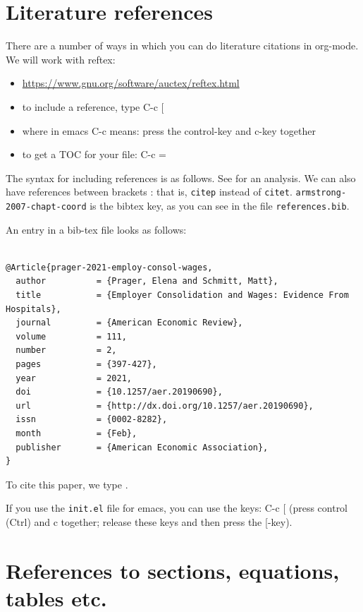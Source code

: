 \documentclass[11pt]{article}
\begin{document}
\section{Literature references}

There are a number of ways in which you can do literature citations in org-mode. We will work with reftex:
\begin{itemize}
\item \url{https://www.gnu.org/software/auctex/reftex.html}
\item to include a reference, type C-c [
\item where in emacs C-c means: press the control-key and c-key together
\item to get a TOC for your file: C-c =
\end{itemize}
The syntax for including references is as follows. See \citet{armstrong-2007-chapt-coord} for an analysis. We can also have references between brackets \citep{athey-2019-machin-learn}: that is, \texttt{citep} instead of \texttt{citet}. \texttt{armstrong-2007-chapt-coord} is the bibtex key, as you can see in the file \texttt{references.bib}.


An entry in a bib-tex file looks as follows:

\begin{verbatim}

@Article{prager-2021-employ-consol-wages,
  author          = {Prager, Elena and Schmitt, Matt},
  title           = {Employer Consolidation and Wages: Evidence From Hospitals},
  journal         = {American Economic Review},
  volume          = 111,
  number          = 2,
  pages           = {397-427},
  year            = 2021,
  doi             = {10.1257/aer.20190690},
  url             = {http://dx.doi.org/10.1257/aer.20190690},
  issn            = {0002-8282},
  month           = {Feb},
  publisher       = {American Economic Association},
}
\end{verbatim}

To cite this paper, we type \cite{prager-2021-employ-consol-wages}.

If you use the \texttt{init.el} file for emacs, you can use the keys: C-c [ (press control (Ctrl) and c together; release these keys and then press the [-key). 


\section{References to sections, equations, tables etc.}
\end{document}
